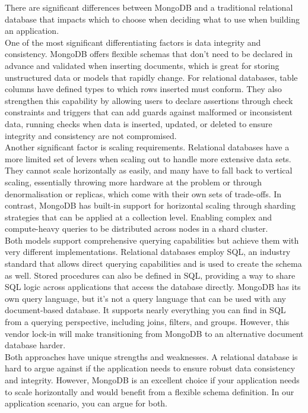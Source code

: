 \documentclass{article}
\begin{document}
There are significant differences between MongoDB and a traditional relational database that impacts which to choose when deciding what to use when building an application.\\
\newline
One of the most significant differentiating factors is data integrity and consistency. MongoDB offers flexible schemas that don't need to be declared in advance and validated when inserting documents, which is great for storing unstructured data or models that rapidly change. For relational databases, table columns have defined types to which rows inserted must conform. They also strengthen this capability by allowing users to declare assertions through check constraints and triggers that can add guards against malformed or inconsistent data, running checks when data is inserted, updated, or deleted to ensure integrity and consistency are not compromised. \\
\newline
Another significant factor is scaling requirements. Relational databases have a more limited set of levers when scaling out to handle more extensive data sets. They cannot scale horizontally as easily, and many have to fall back to vertical scaling, essentially throwing more hardware at the problem or through denormalisation or replicas, which come with their own sets of trade-offs. In contrast, MongoDB has built-in support for horizontal scaling through sharding strategies that can be applied at a collection level. Enabling complex and compute-heavy queries to be distributed across nodes in a shard cluster. \\
\newline
Both models support comprehensive querying capabilities but achieve them with very different implementations. Relational databases employ SQL, an industry standard that allows direct querying capabilities and is used to create the schema as well. Stored procedures can also be defined in SQL, providing a way to share SQL logic across applications that access the database directly. MongoDB has its own query language, but it's not a query language that can be used with any document-based database. It supports nearly everything you can find in SQL from a querying perspective, including joins, filters, and groups. However, this vendor lock-in will make transitioning from MongoDB to an alternative document database harder. \\
\newline
Both approaches have unique strengths and weaknesses. A relational database is hard to argue against if the application needs to ensure robust data consistency and integrity. However, MongoDB is an excellent choice if your application needs to scale horizontally and would benefit from a flexible schema definition. In our application scenario, you can argue for both. \\
\end{document}
